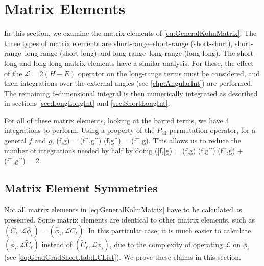 \documentclass[Dissertation.tex]{subfiles}
\begin{document}
\section{Matrix Elements}
In this section, we examine the matrix elements of \cref{eq:GeneralKohnMatrix}.
The three types of matrix elements are short-range--short-range (short-short),
short-range--long-range (short-long) and long-range--long-range (long-long).
The short-long and long-long matrix elements have a similar analysis. For 
these, the effect of the $\mathcal{L} = 2(H-E)$ operator on the long-range 
terms must be considered, and then integrations over the external angles (see 
\cref{chp:AngularInt}) are performed. The remaining 6-dimensional integral is 
then numerically integrated as described in sections \ref{sec:LongLongInt} 
and \ref{sec:ShortLongInt}.

For all of these matrix elements, looking at the barred terms, we have 4
integrations to perform. Using a property of the $P_{23}$ permutation operator,
for a general $f$ and $g$,
\beq
\label{eq:PermProp}
(f,g) = (f^\prime,g^\prime)  (f,g^\prime) = (f^\prime,g).
\eeq
This allows us to reduce the number of integrations needed by half by doing
\beq
\label{eq:PermPropFull}
(\bar{f},\bar{g}) = (f,g) \pm (f,g^\prime) \pm (f^\prime,g) + (f^\prime,g^\prime) = 2.
\eeq


\subsection{Matrix Element Symmetries}
\label{sec:Symmetries}

Not all matrix elements in \cref{eq:GeneralKohnMatrix} have to be calculated as presented. Some matrix elements are identical to other matrix elements, such as $(\widetilde{C}_\ell,\mathcal{L}\bar{\phi}_i) = (\bar{\phi}_i,\mathcal{L}\widetilde{C}_\ell)$. In this particular case, it is much easier to calculate $(\bar{\phi}_i,\mathcal{L}\widetilde{C}_\ell)$ instead of $(\widetilde{C}_\ell,\mathcal{L}\bar{\phi}_i)$, due to the complexity of operating $\mathcal{L}$ on $\bar{\phi}_i$ (see \cref{eq:GradGradShort,tab:LCList}). We prove these claims in this section.
\end{document}

